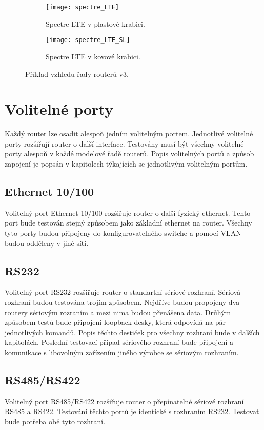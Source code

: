 \begin{figure}[h]
  \begin{subfigure}[h]{0.5\LW}
    \centering
    \texttt{[image: spectre\_LTE]}
    \caption{Spectre LTE v plastové krabici.}
    \label{fig:spectre_LTE}
  \end{subfigure}
  \begin{subfigure}[h]{0.5\LW}
    \centering
    \texttt{[image: spectre\_LTE\_SL]}
    \caption{Spectre LTE v kovové krabici.}
    \label{fig:spectre_LTE_SL}
  \end{subfigure}
  \caption{Příklad vzhledu řady routerů v3.}
  \label{fig:spectre_LTE}
\end{figure}

\section{Volitelné porty}
Každý router lze osadit alespoň jedním volitelným portem. Jednotlivé volitelné porty rozšiřují router o další interface. Testovány musí být všechny volitelné porty alespoň v každé modelové řadě routerů. Popis volitelných portů a způsob zapojení je popsán v kapitolech týkajících se jednotlivým volitelným portům.

\subsection{Ethernet 10/100}
Volitelný port Ethernet 10/100 rozšiřuje router o další fyzický ethernet. Tento port bude testován stejný způsobem jako základní ethernet na router. Všechny tyto porty budou připojeny do konfigurovatelného switche a pomocí VLAN budou odděleny v jiné síti.

\subsection{RS232}
Volitelný port RS232 rozšiřuje router o standartní sériové rozhraní. Sériová rozhraní budou testována trojím způsobem. Nejdříve budou propojeny dva routery sériovým rozraním a mezi nima budou přenášena data. Drůhým způsobem testů bude připojení loopback desky, která odpovídá na pár jednotlivých komandů. Popis těchto destiček pro všechny rozhraní bude v dalších kapitolách. Poslední testovací případ sériového rozhraní bude připojení a komunikace s libovolným zařízením jiného výrobce se sériovým rozhraním.

\subsection{RS485/RS422}
Volitelný port RS485/RS422 rozšiřuje router o přepínatelné sériové rozhraní RS485 a RS422. Testování těchto portů je identické s rozhraním RS232. Testovat bude potřeba obě tyto rozhraní.

